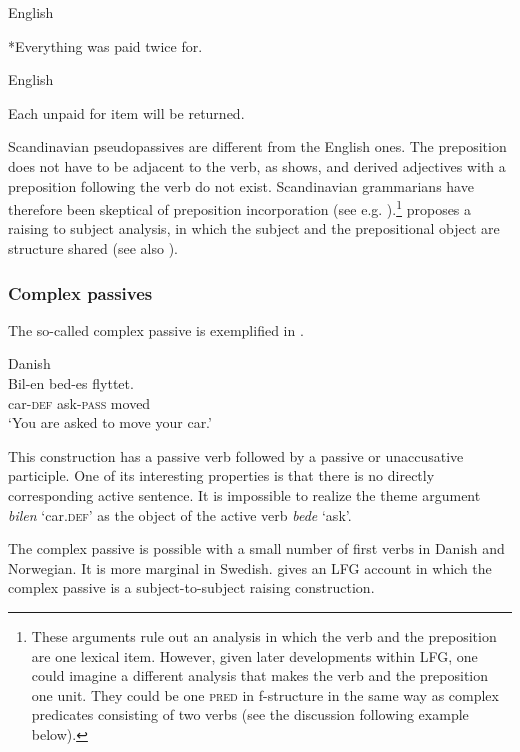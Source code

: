 \documentclass[output=paper,hidelinks]{langscibook}
\begin{document}
\ea\label{ex:Scandinavian:87} English \citep[54]{bresnan1982the-passive}

 {*Everything} {was} {paid} {twice} {for.}\z


 \ea\label{ex:Scandinavian:88} English \citep[53]{bresnan1982the-passive}

 {Each} {unpaid} {for} {item} {will} {be} {returned.}\z

 \noindent Scandinavian pseudopassives are different from the English ones. The preposition does not have to be adjacent to the verb, as  shows, and derived adjectives with a preposition following the verb do not exist. Scandinavian grammarians have therefore been skeptical of preposition incorporation (see e.g. \citealt{Christensen86}).\footnote{These arguments rule out an analysis in which the verb and the preposition are one lexical item. However, given later developments within LFG, one could imagine a different analysis that makes the verb and the preposition one unit. They could be one \textsc{pred} in f-structure in the same way as complex predicates consisting of two verbs (see the discussion following example  below).} \citet{Lodrup91} proposes a raising to subject analysis, in which the subject and the prepositional object are structure shared (see also \citealt{Alsina09}).

\subsubsection{Complex passives}

The so-called complex passive is exemplified in .



\ea\label{ex:Scandinavian:89} Danish \citep{orsnes2006}\\
\gll
 {Bil-en} {bed-es} {flyttet.}\\
 car-\textsc{def} ask-\textsc{pass} moved\\
\glt `You are asked to move your car.'\z

\noindent This construction has a passive verb followed by a passive or unaccusative participle. One of its interesting properties is that there is no directly corresponding active sentence. It is impossible to realize the theme argument \textit{bilen} `car.\textsc{def'} as the object of the active verb \textit{bede} `ask'.

 The complex passive is possible with a small number of first verbs in Danish and Norwegian. It is more marginal in Swedish. \citet{orsnes2006} gives an LFG account in which the complex passive is a subject-to-subject raising construction.
\end{document}
